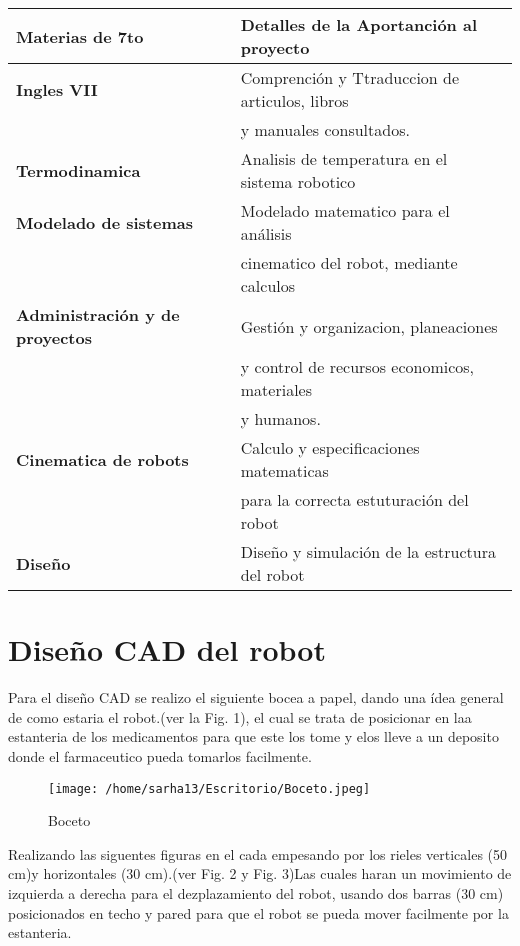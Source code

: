 \documentclass[letter,operight,12pt,spanish]{report}
\begin{document}
\begin{center}
\begin{tabular}{|l|l|}
\hline
	\textbf{Materias de 7to} & \textbf{Detalles de la Aportanci\'on al proyecto}\\
\hline
	\textbf{Ingles VII} & Comprenci\'on y Ttraduccion de articulos, libros\\
	& y manuales consultados.\\
\hline
	\textbf{Termodinamica} & Analisis de temperatura en el sistema robotico\\
\hline	
	\textbf{Modelado de sistemas} & Modelado matematico para el an\'alisis\\
	& cinematico del robot, mediante calculos\\
\hline
	\textbf{Administraci\'on y de proyectos} & Gesti\'on y organizacion, planeaciones\\
	& y control de recursos economicos, materiales\\
	& y humanos.\\
\hline
	\textbf{Cinematica de robots} & Calculo y especificaciones matematicas\\
	& para la correcta estuturaci\'on del robot\\
\hline
\textbf{Dise\~no} & Dise\~no y simulaci\'on de la estructura del robot\\
\hline
\end{tabular}
\end{center}

\newpage

\section{Diseño CAD del robot}

Para el diseño CAD se realizo el siguiente bocea a papel, dando una \'idea general de como estaria el robot.(ver la Fig. 1), el cual se trata de posicionar en laa estanteria de los medicamentos para que este los tome y elos lleve a un deposito donde el farmaceutico pueda tomarlos facilmente.\\

\begin{figure}[htp]
\centering
\texttt{[image: /home/sarha13/Escritorio/Boceto.jpeg]}
\caption{Boceto}
\label{Fig. 1}
\end{figure}

Realizando las siguentes figuras en el cada empesando por los rieles verticales (50 cm)y horizontales (30 cm).(ver Fig. 2 y Fig. 3)Las cuales haran un movimiento de izquierda a derecha para el dezplazamiento del robot, usando dos barras (30 cm) posicionados en techo y pared para que el robot se pueda mover facilmente por la estanteria.\\\\
\end{document}
